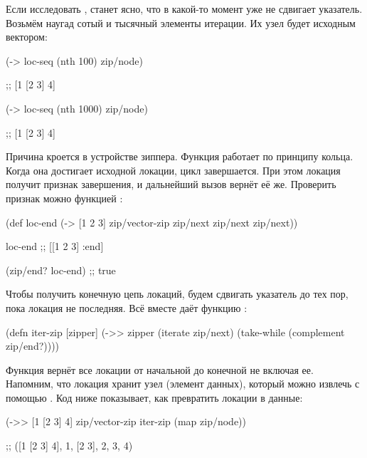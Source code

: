 Если исследовать , станет ясно, что в какой-то момент  уже не
сдвигает указатель. Возьмём наугад сотый и тысячный элементы итерации. Их узел
будет исходным вектором:

\begin{english}
  \begin{clojure}
(-> loc-seq (nth 100) zip/node)

;; [1 [2 3] 4]

(-> loc-seq (nth 1000) zip/node)

;; [1 [2 3] 4]

  \end{clojure}
\end{english}

Причина кроется в устройстве зиппера. Функция  работает по принципу
кольца. Когда она достигает исходной локации, цикл завершается. При этом локация
получит признак завершения, и дальнейший вызов  вернёт её
же. Проверить признак можно функцией :


\begin{english}
  \begin{clojure}
(def loc-end
  (-> [1 2 3]
      zip/vector-zip
      zip/next
      zip/next
      zip/next))

loc-end
;; [[1 2 3] :end]

(zip/end? loc-end)
;; true

  \end{clojure}
\end{english}

Чтобы получить конечную цепь локаций, будем сдвигать указатель до тех пор, пока
локация не последняя. Всё вместе даёт функцию :

\begin{english}
  \begin{clojure}
(defn iter-zip [zipper]
  (->> zipper
       (iterate zip/next)
       (take-while (complement zip/end?))))
  \end{clojure}
\end{english}

Функция вернёт все локации от начальной до конечной не включая ее. Напомним, что
локация хранит узел (элемент данных), который можно извлечь с помощью
. Код ниже показывает, как превратить локации в данные:

\begin{english}
  \begin{clojure}
(->> [1 [2 3] 4]
     zip/vector-zip
     iter-zip
     (map zip/node))

;; ([1 [2 3] 4], 1, [2 3], 2, 3, 4)
  \end{clojure}
\end{english}

